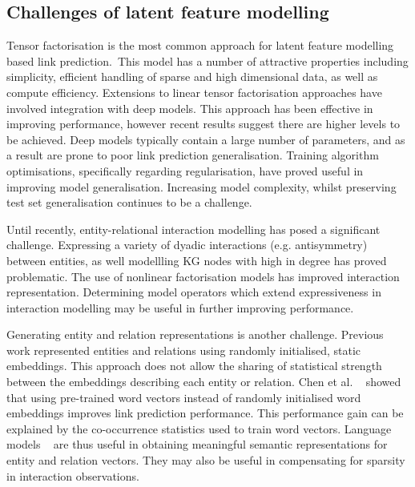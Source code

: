 \subsection{Challenges of latent feature modelling} 

Tensor factorisation is the most common approach for latent feature modelling based link prediction.\ This model has a number of attractive properties including simplicity, efficient handling of sparse and high dimensional data, as well as compute efficiency. Extensions to linear tensor factorisation approaches have involved integration with deep models. This approach has been effective in improving performance, however recent results suggest there are higher levels to be achieved. Deep models typically contain a large number of parameters, and as a result are prone to poor link prediction generalisation. Training algorithm optimisations, specifically regarding regularisation, have proved useful in improving model generalisation. Increasing model complexity, whilst preserving test set generalisation continues to be a challenge. \par

\noindent Until recently, entity-relational interaction modelling has posed a significant challenge. Expressing a variety of dyadic interactions (e.g. antisymmetry) between entities, as well modellling KG nodes with high in degree has proved problematic. The use of nonlinear factorisation models has improved interaction representation. Determining model operators which extend expressiveness in interaction modelling may be useful in further improving performance.\par

\noindent Generating entity and relation representations is another challenge. Previous work represented entities and relations using randomly initialised, static embeddings. This approach does not allow the sharing of statistical strength between the embeddings describing each entity or relation. Chen et al. \unskip~\citep{socher2013reasoning} showed that using pre-trained word vectors instead of randomly initialised word embeddings improves link prediction performance. This performance gain can be explained by the co-occurrence statistics used to train word vectors. Language models \unskip~\citep{ bojanowski2016enriching, vaswani2017attention} are thus useful in obtaining meaningful semantic representations for entity and relation vectors. They may also be useful in compensating for sparsity in interaction observations. \par

